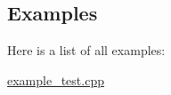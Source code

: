 \subsection{Examples}
Here is a list of all examples\+:\begin{DoxyCompactItemize}
\item 
\hyperlink{example_test_8cpp-example}{example\+\_\+test.\+cpp}
\end{DoxyCompactItemize}
